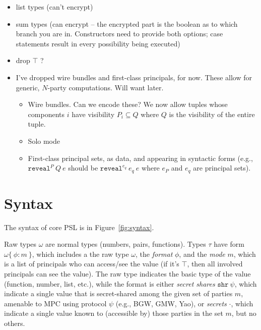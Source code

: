 \documentclass[10pt]{article}
\newcommand{\kw}[1]{\ensuremath{\mathtt{#1}}}
\newcommand{\ssec}{\ensuremath{\mathtt{\cdot}}}
\newcommand{\isec}{\ensuremath{\mathtt{pmap}}}
\newcommand{\sshare}[1]{\ensuremath{\mathtt{shr}~{#1}}}
\newcommand{\sectyp}[3]{\ensuremath{{#1} \{~{#2}:{#3}~\}}}
\newcommand{\ereveal}[3]{\ensuremath{\kw{reveal}^{#1}~{#2}~{#3}}}
\begin{document}
\begin{itemize}
\item list types (can't encrypt)
\item sum types (can encrypt -- the encrypted part is the boolean as
  to which branch you are in. Constructors need to provide both
  options; case statements result in every possibility being executed)
\item drop $\top$ ?
\item I've dropped wire bundles and first-class principals, for
  now. These allow for generic, $N$-party computations. Will want
  later.
  \begin{itemize}
  \item Wire bundles. Can we encode these? We now allow tuples whose
    components $i$ have visibility $P_i \subseteq Q$ where $Q$ is the
    visibility of the entire tuple.
  \item Solo mode
  \item First-class principal sets, as data, and appearing in
    syntactic forms (e.g., $\ereveal{P}{Q}{e}$ should be
    $\ereveal{e_q}{e_q}{e}$ where $e_P$ and $e_q$ are principal sets).
  \end{itemize}
\end{itemize}

\section{Syntax}
  
The syntax of core PSL is in Figure~\ref{fig:syntax}.

Raw types $\omega$ are normal types (numbers, pairs, functions). Types
$\tau$ have form $\sectyp{\omega}{\phi}{m}$, which includes a the raw
type $\omega$, the \emph{format} $\phi$, and the \emph{mode}
$m$, which is a list of principals who can access/see the value (if
it's $\top$, then all involved principals can see the value). The raw
type indicates the basic type of the value (function, number, list,
etc.), while the format is either \emph{secret shares} $\sshare\psi$,
which indicate a single value that is secret-shared among the given
set of parties $m$, amenable to MPC using protocol $\psi$ (e.g., BGW,
GMW, Yao), or \emph{secrets} \ssec, which indicate a single value
known to (accessible by) those parties in the set $m$, but no others.
\end{document}
